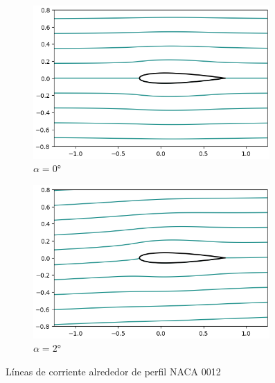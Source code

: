 \documentclass[letterpaper, openright, 12pt]{book}
\begin{document}
\begin{figure}[htbp!]
\begin{subfigure}[c]{0.48\textwidth}
            \includegraphics[keepaspectratio, width=0.99\textwidth]
                {./img/potential_flow_stream_0}
            \caption{$\alpha = 0\si{\degree}$}
            \label{fig:potential_flow_stream_0}
        \end{subfigure}
        \hfill
        \begin{subfigure}[c]{0.48\textwidth}
            \includegraphics[keepaspectratio, width=0.99\textwidth]
                {./img/potential_flow_stream_2}
            \caption{$\alpha = 2\si{\degree}$}
            \label{fig:potential_flow_stream_2}
        \end{subfigure}
        \caption{Líneas de corriente alrededor de perfil NACA 0012}
        \label{fig:potential_flow_stream__0}
    \end{figure}
\end{document}

